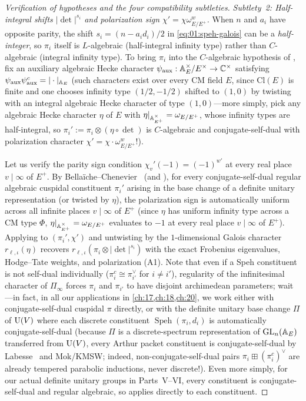 \begin{proof}[Verification of hypotheses and the four compatibility subtleties]
\medskip\noindent
\emph{Subtlety~2: Half-integral shifts $|\det|^{s_i}$ and polarization sign $\chi' = \chi \omega_{E/E^+}^w$.}
When $n$ and $a_i$ have opposite parity, the shift $s_i = (n - a_i d_i)/2$ in \eqref{eq:01:speh-galois} can be a \emph{half-integer}, so $\pi_i$ itself is $L$-algebraic (half-integral infinity type) rather than $C$-algebraic (integral infinity type). To bring $\pi_i$ into the $C$-algebraic hypothesis of \cite[Theorem~2.1.1]{BLGGT2014}, fix an auxiliary algebraic Hecke character $\psi_{\mathrm{aux}} : \mathbb{A}_E^\times / E^\times \to \mathbb{C}^\times$ satisfying $\psi_{\mathrm{aux}} \psi_{\mathrm{aux}}^c = |\cdot|_{\mathbb{A}_E}$ (such characters exist over every CM field $E$, since $\mathrm{Cl}(E)$ is finite and one chooses infinity type $(1/2, -1/2)$ shifted to $(1, 0)$ by twisting with an integral algebraic Hecke character of type $(1,0)$—more simply, pick any algebraic Hecke character $\eta$ of $E$ with $\eta|_{\mathbb{A}_{E^+}^\times} = \omega_{E/E^+}$, whose infinity types are half-integral, so $\pi_i' := \pi_i \otimes (\eta \circ \det)$ is $C$-algebraic and conjugate-self-dual with polarization character $\chi' = \chi \cdot \omega_{E/E^+}^w$!).

Let us verify the parity sign condition $\chi_v'(-1) = (-1)^{w'}$ at every real place $v \mid \infty$ of $E^+$. By Bella\"iche--Chenevier~\cite[Theorem~1.2]{BellaicheChenevier2011} (and \cite[Lemma~2.1.2]{BLGGT2014}), for every conjugate-self-dual regular algebraic cuspidal constituent $\pi_i'$ arising in the base change of a definite unitary representation (or twisted by $\eta$), the polarization sign is automatically uniform across all infinite places $v \mid \infty$ of $E^+$ (since $\eta$ has uniform infinity type across a CM type $\Phi$, $\eta|_{\mathbb{A}_{E^+}^\times} = \omega_{E/E^+}$ evaluates to $-1$ at every real place $v \mid \infty$ of $E^+$). Applying \cite[Theorem~2.1.1]{BLGGT2014} to $(\pi_i', \chi')$ and untwisting by the $1$-dimensional Galois character $r_{\ell,\iota}(\eta)$ recovers $r_{\ell,\iota}(\pi_i \otimes |\det|^{s_i})$ with the exact Frobenius eigenvalues, Hodge--Tate weights, and polarization (A1). Note that even if a Speh constituent is not self-dual individually ($\pi_i^c \cong \pi_{i'}^\vee$ for $i \neq i'$), regularity of the infinitesimal character of $\Pi_\infty$ forces $\pi_i$ and $\pi_{i'}$ to have disjoint archimedean parameters; wait—in fact, in all our applications in \cref{ch:17,ch:18,ch:20}, we work either with conjugate-self-dual cuspidal $\pi$ directly, or with the definite unitary base change $\Pi$ of $\mathrm{U}(V)$ where each discrete constituent $\operatorname{Speh}(\pi_i, d_i)$ is automatically conjugate-self-dual (because $\Pi$ is a discrete-spectrum representation of $\mathrm{GL}_n(\mathbb{A}_E)$ transferred from $\mathrm{U}(V)$, every Arthur packet constituent is conjugate-self-dual by Labesse~\cite[Corollaire~5.3]{Labesse2011} and Mok/KMSW; indeed, non-conjugate-self-dual pairs $\pi_i \boxplus (\pi_i^c)^\vee$ are already tempered parabolic inductions, never discrete!). Even more simply, for our actual definite unitary groups in Parts~V--VI, every constituent is conjugate-self-dual and regular algebraic, so \cite[Theorem~2.1.1]{BLGGT2014} applies directly to each constituent.


\end{proof}
